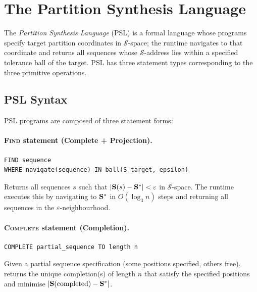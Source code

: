 \section{The Partition Synthesis Language}
\label{sec:psl}

\begin{definition}
\label{def:psl}
The \emph{Partition Synthesis Language} (PSL) is a formal language whose
programs specify target partition coordinates in $\mathcal{S}$-space;
the runtime navigates to that coordinate and returns all sequences
whose $\mathcal{S}$-address lies within a specified tolerance ball of
the target. PSL has three statement types corresponding to the three
primitive operations.
\end{definition}

\subsection{PSL Syntax}
\label{ssec:psl_syntax}

PSL programs are composed of three statement forms:

\paragraph{\textsc{Find} statement (Complete + Projection).}
\begin{verbatim}
FIND sequence
WHERE navigate(sequence) IN ball(S_target, epsilon)
\end{verbatim}
Returns all sequences $s$ such that $|\mathbf{S}(s) - \mathbf{S}^*| < \varepsilon$
in $\mathcal{S}$-space. The runtime executes this by navigating to
$\mathbf{S}^*$ in $O(\log_3 n)$ steps and returning all sequences in the
$\varepsilon$-neighbourhood.

\paragraph{\textsc{Complete} statement (Completion).}
\begin{verbatim}
COMPLETE partial_sequence TO length n
\end{verbatim}
Given a partial sequence specification (some positions specified, others
free), returns the unique completion(s) of length $n$ that satisfy the
specified positions and minimise $|\mathbf{S}(\text{completed}) - \mathbf{S}^*|$.

